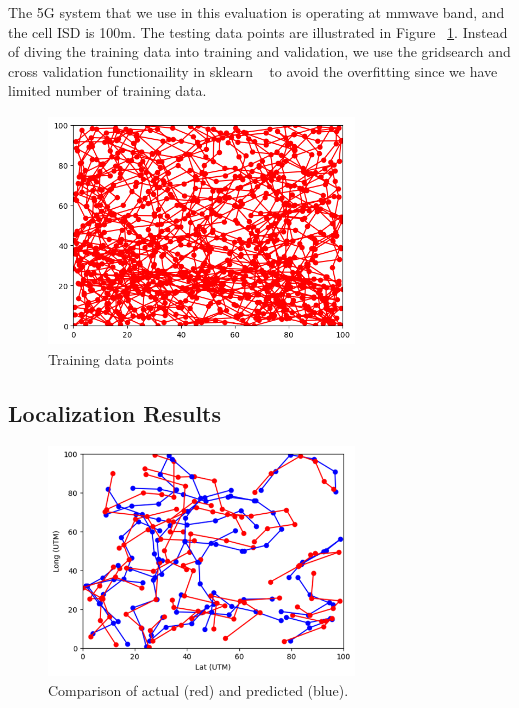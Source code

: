 \documentclass[conference, 10pt]{IEEEtran}
\begin{document}
The 5G system that we use in this evaluation is operating at mmwave band, and the cell ISD is 100m. The testing data points are illustrated in 
Figure ~\ref{fig:training}. Instead of diving the training data into training and validation, we use the gridsearch and cross validation functionaility in 
sklearn ~\cite{sklearn} to avoid the overfitting since we have limited number of training data.

\begin{figure}[t]
	\begin{center}
	\includegraphics[height=2.4in,width=3.2in]{./GM_training.png}
	\caption{\label{fig:training}
	{\small Training data points}}
	\end{center}
	\end{figure}		

\subsection{Localization Results}


\begin{figure}[t]
\begin{center}
\includegraphics[height=2.4in,width=3.2in]{./Combined_path_illustration.png}
\caption{\label{fig:toyeg}
{\small Comparison of actual (red) and predicted (blue).}}
\end{center}
\end{figure}
\end{document}
